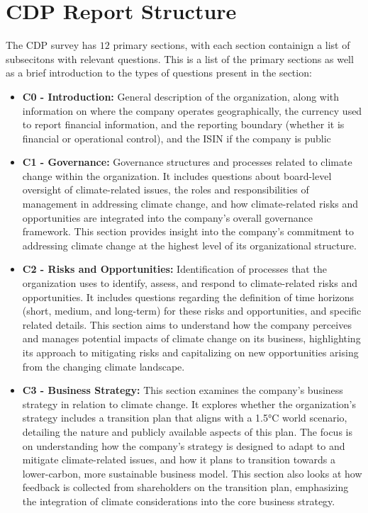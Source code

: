 \section{CDP Report Structure}
The CDP survey has $12$ primary sections, with each section containign a list of subsecitons with relevant questions. This is a list of the primary sections as well as a brief introduction to the types of questions present in the section:
\begin{itemize}
    \item \textbf{C0 - Introduction:} General description of the organization, along with information on where the company operates geographically, the currency used to report financial information, and the reporting boundary (whether it is financial or operational control), and the ISIN if the company is public
    \item \textbf{C1 - Governance:} Governance structures and processes related to climate change within the organization. It includes questions about board-level oversight of climate-related issues, the roles and responsibilities of management in addressing climate change, and how climate-related risks and opportunities are integrated into the company's overall governance framework. This section provides insight into the company's commitment to addressing climate change at the highest level of its organizational structure.
    \item \textbf{C2 - Risks and Opportunities:} Identification of processes that the organization uses to identify, assess, and respond to climate-related risks and opportunities. It includes questions regarding the definition of time horizons (short, medium, and long-term) for these risks and opportunities, and specific related details. This section aims to understand how the company perceives and manages potential impacts of climate change on its business, highlighting its approach to mitigating risks and capitalizing on new opportunities arising from the changing climate landscape.
    \item \textbf{C3 - Business Strategy:} This section examines the company's business strategy in relation to climate change. It explores whether the organization's strategy includes a transition plan that aligns with a 1.5°C world scenario, detailing the nature and publicly available aspects of this plan. The focus is on understanding how the company's strategy is designed to adapt to and mitigate climate-related issues, and how it plans to transition towards a lower-carbon, more sustainable business model. This section also looks at how feedback is collected from shareholders on the transition plan, emphasizing the integration of climate considerations into the core business strategy.

\end{itemize}
